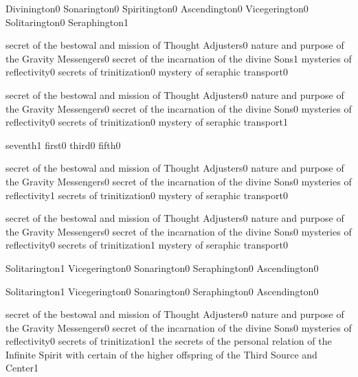 {Divinington}{0}
{Sonarington}{0}
{Spiritington}{0}
{Ascendington}{0}
{Vicegerington}{0}
{Solitarington}{0}
{Seraphington}{1}
\qstop

{secret of the bestowal and mission of Thought Adjusters}{0}
{nature and purpose of the Gravity Messengers}{0}
{secret of the incarnation of the divine Sons}{1}
{mysteries of reflectivity}{0}
{secrets of trinitization}{0}
{mystery of seraphic transport}{0}
\qstop

{secret of the bestowal and mission of Thought Adjusters}{0}
{nature and purpose of the Gravity Messengers}{0}
{secret of the incarnation of the divine Sons}{0}
{mysteries of reflectivity}{0}
{secrets of trinitization}{0}
{mystery of seraphic transport}{1}
\qstop

{seventh}{1}
{first}{0}
{third}{0}
{fifth}{0}
\qstop

{secret of the bestowal and mission of Thought Adjusters}{0}
{nature and purpose of the Gravity Messengers}{0}
{secret of the incarnation of the divine Sons}{0}
{mysteries of reflectivity}{1}
{secrets of trinitization}{0}
{mystery of seraphic transport}{0}
\qstop

{secret of the bestowal and mission of Thought Adjusters}{0}
{nature and purpose of the Gravity Messengers}{0}
{secret of the incarnation of the divine Sons}{0}
{mysteries of reflectivity}{0}
{secrets of trinitization}{1}
{mystery of seraphic transport}{0}
\qstop

{Solitarington}{1}
{Vicegerington}{0}
{Sonarington}{0}
{Seraphington}{0}
{Ascendington}{0}
\qstop

{Solitarington}{1}
{Vicegerington}{0}
{Sonarington}{0}
{Seraphington}{0}
{Ascendington}{0}
\qstop

{secret of the bestowal and mission of Thought Adjusters}{0}
{nature and purpose of the Gravity Messengers}{0}
{secret of the incarnation of the divine Sons}{0}
{mysteries of reflectivity}{0}
{secrets of trinitization}{1}
{the secrets of the personal relation of the Infinite Spirit with certain of the higher offspring of the Third Source and Center}{1}
\qstop


